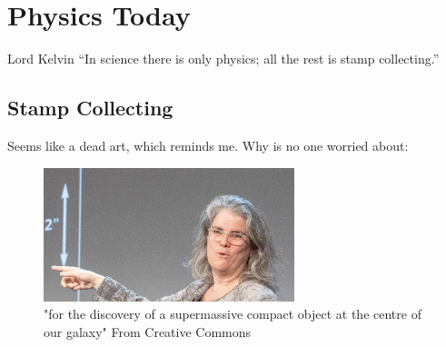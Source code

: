 \documentclass[../rzero]{subfiles}
\begin{document}
\chapter{Physics Today}\label{physicsTodayChapter}

\begin{chapquote}{Lord Kelvin}
``In science there is only physics; all the rest is stamp collecting.''
\end{chapquote}





\section{Stamp Collecting}
Seems like a dead art, which reminds me. Why is no one worried about:
\begin{figure}\label{andrea-ghez}
\includegraphics[width=0.65\textwidth]{chapters/images/andrea-ghez.jpg}
\caption{"for the discovery of a supermassive compact object at the centre of our galaxy"   From\cite{borderlinerebelEnglishAndreaGhez2019} Creative Commons}
\end{figure}
\end{document}
